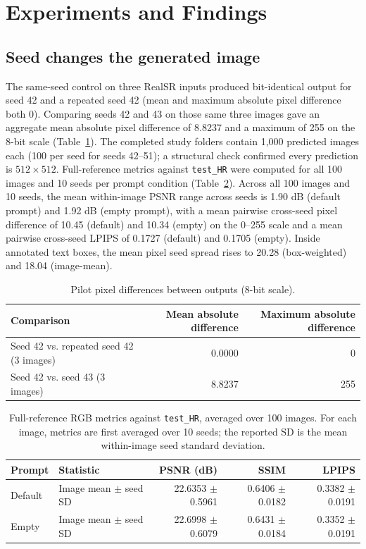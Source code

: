 \documentclass[11pt]{article}
\begin{document}
\section{Experiments and Findings}
\subsection{Seed changes the generated image}
The same-seed control on three RealSR inputs produced bit-identical output for seed 42 and a repeated seed 42 (mean and maximum absolute pixel difference both 0). Comparing seeds 42 and 43 on those same three images gave an aggregate mean absolute pixel difference of 8.8237 and a maximum of 255 on the 8-bit scale (Table~\ref{tab:pilot-diff}). The completed study folders contain 1,000 predicted images each (100 per seed for seeds 42--51); a structural check confirmed every prediction is $512\times512$. Full-reference metrics against \texttt{test\_HR} were computed for all 100 images and 10 seeds per prompt condition (Table~\ref{tab:metrics}). Across all 100 images and 10 seeds, the mean within-image PSNR range across seeds is 1.90 dB (default prompt) and 1.92 dB (empty prompt), with a mean pairwise cross-seed pixel difference of 10.45 (default) and 10.34 (empty) on the 0--255 scale and a mean pairwise cross-seed LPIPS of 0.1727 (default) and 0.1705 (empty). Inside annotated text boxes, the mean pixel seed spread rises to 20.28 (box-weighted) and 18.04 (image-mean).

\begin{table}[ht]
\centering
\caption{Pilot pixel differences between outputs (8-bit scale).}
\label{tab:pilot-diff}
\begin{tabular}{lrr}
\toprule
Comparison & Mean absolute difference & Maximum absolute difference \\
\midrule
Seed 42 vs. repeated seed 42 (3 images) & 0.0000 & 0 \\
Seed 42 vs. seed 43 (3 images) & 8.8237 & 255 \\
\bottomrule
\end{tabular}
\end{table}

\begin{table}[ht]
\centering
\caption{Full-reference RGB metrics against \texttt{test\_HR}, averaged over 100 images. For each image, metrics are first averaged over 10 seeds; the reported SD is the mean within-image seed standard deviation.}
\label{tab:metrics}
\begin{tabular}{llrrr}
\toprule
Prompt & Statistic & PSNR (dB) & SSIM & LPIPS \\
\midrule
Default & Image mean $\pm$ seed SD & 22.6353 $\pm$ 0.5961 & 0.6406 $\pm$ 0.0182 & 0.3382 $\pm$ 0.0191 \\
Empty & Image mean $\pm$ seed SD & 22.6998 $\pm$ 0.6079 & 0.6431 $\pm$ 0.0184 & 0.3352 $\pm$ 0.0191 \\
\bottomrule
\end{tabular}
\end{table}
\end{document}
